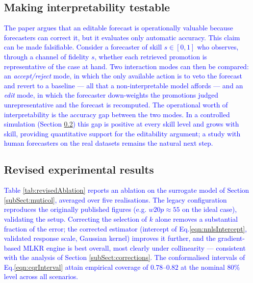 \documentclass{ieeeaccess}
\newcommand{\myblue}[1]{\textcolor{blue}{#1}}
\begin{document}
\subsection{Making interpretability testable} \label{subSect:loop}

\myblue{The paper argues that an editable forecast is operationally valuable
because forecasters can correct it, but it evaluates only automatic accuracy.
This claim can be made falsifiable. Consider a forecaster of skill $s \in
[0,1]$ who observes, through a channel of fidelity $s$, whether each retrieved
promotion is representative of the case at hand. Two interaction modes can then
be compared: an \emph{accept/reject} mode, in which the only available action is
to veto the forecast and revert to a baseline --- all that a non-interpretable
model affords --- and an \emph{edit} mode, in which the forecaster down-weights
the promotions judged unrepresentative and the forecast is recomputed. The
operational worth of interpretability is the accuracy gap between the two modes.
In a controlled simulation (Section \ref{subSect:revisedResults}) this gap is
positive at every skill level and grows with skill, providing quantitative
support for the editability argument; a study with human forecasters on the
real datasets remains the natural next step.}

\subsection{Revised experimental results} \label{subSect:revisedResults}

\myblue{Table \ref{tab:revisedAblation} reports an ablation on the surrogate
model of Section \ref{subSect:muticol}, averaged over five realisations. The
legacy configuration reproduces the originally published figures (e.g.
$w20p\approx55$ on the ideal case), validating the setup. Correcting the
selection of $k$ alone removes a substantial fraction of the error; the
corrected estimator (intercept of Eq.\eqref{eqn:nnlsIntercept}, validated
response scale, Gaussian kernel) improves it further, and the gradient-based
MLKR engine is best overall, most clearly under collinearity --- consistent with
the analysis of Section \ref{subSect:corrections}. The conformalised intervals
of Eq.\eqref{eqn:cqrInterval} attain empirical coverage of $0.78$--$0.82$ at the
nominal $80\%$ level across all scenarios.}
\end{document}
